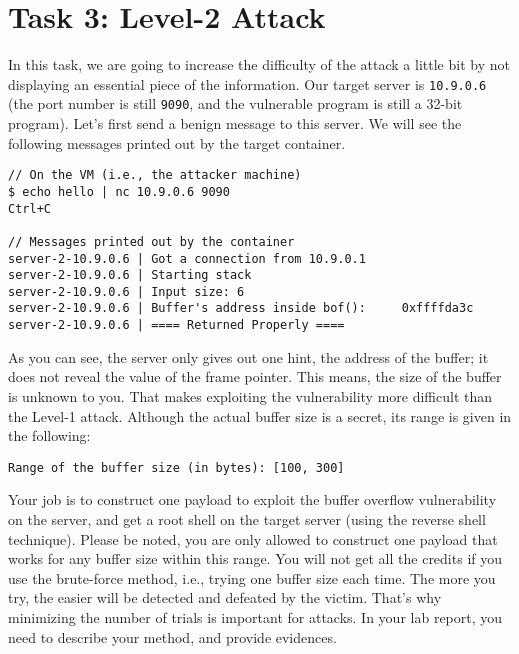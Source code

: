 \section{Task 3: Level-2 Attack} 

In this task, we are going to increase the difficulty
of the attack a little bit by not displaying an essential 
piece of the information. Our target server is 
\texttt{10.9.0.6} (the port number is still \texttt{9090}, and the 
vulnerable program is still a 32-bit program). 
Let's first send a benign message to this server. 
We will see the following messages printed out by the target container. 

\begin{lstlisting}
// On the VM (i.e., the attacker machine)
$ echo hello | nc 10.9.0.6 9090
Ctrl+C

// Messages printed out by the container
server-2-10.9.0.6 | Got a connection from 10.9.0.1
server-2-10.9.0.6 | Starting stack
server-2-10.9.0.6 | Input size: 6
server-2-10.9.0.6 | Buffer's address inside bof():     0xffffda3c
server-2-10.9.0.6 | ==== Returned Properly ====
\end{lstlisting}
 
As you can see, the server only gives out one hint, the 
address of the buffer; it does not reveal the value of the 
frame pointer. This means, the size of the buffer is unknown
to you. That makes exploiting the vulnerability more 
difficult than the Level-1 attack. 
Although the actual buffer size is a secret, its range
is given in the following:

\begin{lstlisting}
Range of the buffer size (in bytes): [100, 300]
\end{lstlisting}
 

Your job is to construct one payload to exploit the buffer overflow
vulnerability on the server, and get a root shell on the target server (using
the reverse shell technique). Please be noted, you are only allowed 
to construct one payload that works for any buffer size 
within this range.  You will not get all the credits if you 
use the brute-force method, i.e., trying one buffer size
each time. The more you try, the easier will be detected 
and defeated by the victim. That's why minimizing the number 
of trials is important for attacks. 
In your lab report, you need to describe your method, 
and provide evidences.



